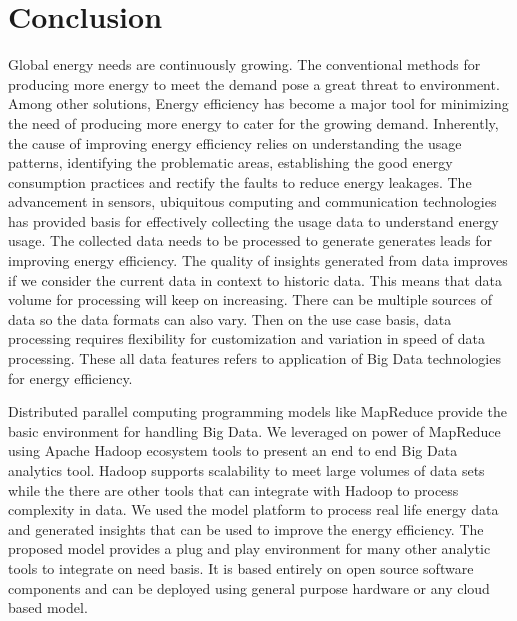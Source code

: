 \chapter{Conclusion}
\label{chapter:concluion}

Global energy needs are continuously growing. The conventional methods for producing more energy to meet the demand pose a great threat to environment. Among other solutions, Energy efficiency has become a major tool for minimizing the need of producing more energy to cater for the growing demand. Inherently, the cause of improving energy efficiency relies on understanding the usage patterns, identifying the problematic areas, establishing the good energy consumption practices and rectify the faults to reduce energy leakages. The advancement in sensors, ubiquitous computing  and communication technologies has provided basis for effectively collecting the usage data to understand energy usage. The collected data needs to be processed to generate generates leads for improving energy efficiency. The quality of insights generated from data improves if we consider the current data in context to historic data. This means that data volume for processing will keep on increasing. There can be multiple sources of data so the data formats can also vary. Then on the use case basis, data processing requires flexibility for customization and variation in speed of data processing. These all data features refers to application of Big Data technologies for energy efficiency. 

Distributed parallel computing programming models like MapReduce provide the basic environment for handling Big Data. We leveraged on power of MapReduce using Apache Hadoop ecosystem tools to present an end to end Big Data analytics tool. Hadoop supports scalability to meet large volumes of data sets while the there are other tools that can integrate with Hadoop to process complexity in data. We used the model platform to process real life energy data and generated insights that can be used to improve the energy efficiency. The proposed model provides a plug and play environment for many other analytic tools to integrate on need basis. It is based entirely on open source software components and can be deployed using general purpose hardware or any cloud based model.


